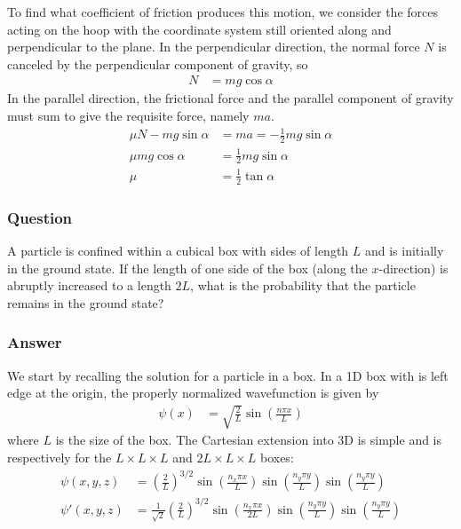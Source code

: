 To find what coefficient of friction produces this motion, we consider the
forces acting on the hoop with the coordinate system still oriented along and
perpendicular to the plane. In the perpendicular direction, the normal force
$N$ is canceled by the perpendicular component of gravity, so
\begin{align*}
    N &= mg\cos {\alpha}
\end{align*}
In the parallel direction, the frictional force and the parallel component of
gravity must sum to give the requisite force, namely $ma$.
\begin{align*}
    {\mu}N - mg\sin {\alpha} &= ma = -\frac 12 mg\sin {\alpha} \\
    {\mu}mg\cos {\alpha} &= \frac 12 mg\sin {\alpha} \\
    {\mu} &= \frac 12 \tan {\alpha}
\end{align*}


\subsubsection{Question}

A particle is confined within a cubical box with sides of length $L$ and is
initially in the ground state. If the length of one side of the box (along
the $x$-direction) is abruptly increased to a length $2L$, what is the
probability that the particle remains in the ground state?

\subsubsection{Answer}

We start by recalling the solution for a particle in a box. In a 1D box with is
left edge at the origin, the properly normalized wavefunction is given by
\begin{align*}
    \psi (x) &= \sqrt{\frac{2}{L}} \sin (\frac{n{\pi} x}{L})
\end{align*}
where $L$ is the size of the box. The Cartesian extension into 3D is simple
and is respectively for the $L\times L\times L$ and $2L\times L\times L$ boxes:
\begin{align*}
    \psi (x,y,z) &= (\frac{2}{L})^{3/2} \sin(\frac{n_x {\pi} x}{L})
	\sin(\frac{n_y {\pi} y}{L}) \sin(\frac{n_y {\pi} y}{L}) \\
    \psi '(x,y,z) &= \frac{1}{\sqrt 2}(\frac{2}{L})^{3/2} \sin(\frac{n_x {\pi} x}{2L})
	\sin(\frac{n_y {\pi} y}{L}) \sin(\frac{n_y {\pi} y}{L})
\end{align*}

